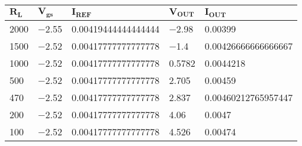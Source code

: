  \begin{tabular}[H]{| l | l | l | l | l |}
\hline

$\mathbf{R_L}$ & $\mathbf{V_{gs}}$ & $\mathbf{I_{REF}}$ & $\mathbf{V_{OUT}}$ &  $\mathbf{I_{OUT}}$ \\ \hline 
2000 & \num{-2.55} & \num{0.00419444444444444} & \num{-2.98} &  \num{0.00399} \\ \hline 
1500 & \num{-2.52} & \num{0.00417777777777778} & \num{-1.4} &  \num{0.00426666666666667} \\ \hline 
1000 & \num{-2.52} & \num{0.00417777777777778} & \num{0.5782} &  \num{0.0044218} \\ \hline 
500 & \num{-2.52} & \num{0.00417777777777778} & \num{2.705} &  \num{0.00459} \\ \hline 
470 & \num{-2.52} & \num{0.00417777777777778} & \num{2.837} &  \num{0.00460212765957447} \\ \hline 
200 & \num{-2.52} & \num{0.00417777777777778} & \num{4.06} &  \num{0.0047} \\ \hline 
100 & \num{-2.52} & \num{0.00417777777777778} & \num{4.526} &  \num{0.00474} \\ \hline 
\end{tabular}